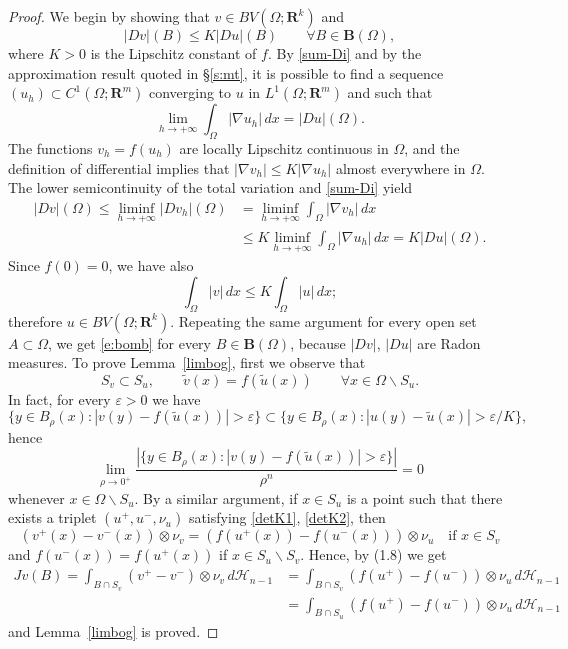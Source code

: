 \documentclass[manuscript, printscheme]{aomart}
\newtheorem[{}\it]{thm}{Theorem}[section]
\theoremstyle{definition}
\newtheorem*[{}\it]{notation}{Notation}
\newcommand{\secref}[1]{\S\ref{#1}}
\newcommand{\lemref}[1]{Lemma~\ref{#1}}
\newcommand{\envert}[1]{\left\lvert#1\right\rvert}
\let\abs=\envert
\begin{document}
\begin{proof}
 We begin by showing that $v\in BV(\Omega;\mathbf{R}^k)$ and
\begin{equation}\label{e:bomb}
\abs{Dv}(B)\le K\abs{Du}(B)\qquad\forall B\in\mathbf{B}(\Omega ),
\end{equation}
where $K>0$ is the Lipschitz constant of $f$. By \eqref{sum-Di} and by
the approximation result quoted in \secref{s:mt}, it is possible to find
a sequence $(u_h)\subset C^1(\Omega ;\mathbf{R}^m)$ converging to $u$ in
$L^1(\Omega ;\mathbf{R}^m)$ and such that
\[\lim_{h\to +\infty}\int_\Omega \abs{\nabla u_h}\,dx=\abs{Du}(\Omega ).\]
The functions $v_h=f(u_h)$ are locally Lipschitz continuous in $\Omega
$, and the definition of differential implies that $\abs{\nabla v_h}\le
K\abs{\nabla u_h}$ almost everywhere in $\Omega $. The lower semicontinuity
of the total variation and \eqref{sum-Di} yield
\begin{equation}
\begin{split}
\abs{Dv}(\Omega )\le\liminf_{h\to +\infty}\abs{Dv_h}(\Omega) &
=\liminf_{h\to +\infty}\int_\Omega \abs{\nabla v_h}\,dx\\
&\le K\liminf_{h\to +\infty}\int_\Omega
\abs{\nabla u_h}\,dx=K\abs{Du}(\Omega).
\end{split}\end{equation}
Since $f(0)=0$, we have also
\[\int_\Omega \abs{v}\,dx\le K\int_\Omega \abs{u}\,dx;\]
therefore $u\in BV(\Omega ;\mathbf{R}^k)$. Repeating the same argument
for every open set $A\subset\Omega $, we get \eqref{e:bomb} for every
$B\in\mathbf{B}(\Omega)$, because $\abs{Dv}$, $\abs{Du}$ are Radon measures. To
prove \lemref{limbog}, first we observe that
\begin{equation}\label{e:SS}
S_v\subset S_u,\qquad\tilde v(x)=f(\tilde u(x))\qquad \forall x\in\Omega
\backslash S_u.\end{equation}
In fact, for every $\varepsilon >0$ we have
\[\{y\in B_\rho(x): \abs{v(y)-f(\tilde u(x))}>\varepsilon \}\subset \{y\in
B_\rho(x): \abs{u(y)-\tilde u(x)}>\varepsilon /K\},\]
hence
\[\lim_{\rho\to 0^+}\frac{\abs{\{y\in B_\rho(x): \abs{v(y)-f(\tilde u(x))}>
\varepsilon \}}}{\rho^n}=0\]
whenever $x\in\Omega \backslash S_u$. By a similar argument, if $x\in
S_u$ is a point such that there exists a triplet $(u^+,u^-,\nu_u)$
satisfying \eqref{detK1}, \eqref{detK2}, then
\[
(v^+(x)-v^-(x))\otimes \nu_v=(f(u^+(x))-f(u^-(x)))\otimes\nu_u\quad
\text{if }x\in S_v
\]
and $f(u^-(x))=f(u^+(x))$ if $x\in S_u\backslash S_v$. Hence, by (1.8)
we get
\begin{equation*}\begin{split}
Jv(B)=\int_{B\cap S_v}(v^+-v^-)\otimes \nu_v\,d\mathcal{H}_{n-1}&=
\int_{B\cap S_v}(f(u^+)-f(u^-))\otimes \nu_u\,d\mathcal{H}_{n-1}\\
&=\int_{B\cap S_u}(f(u^+)-f(u^-))\otimes \nu_u\,d\mathcal{H}_{n-1}
\end{split}\end{equation*}
and \lemref{limbog} is proved.
\end{proof}
\end{document}
